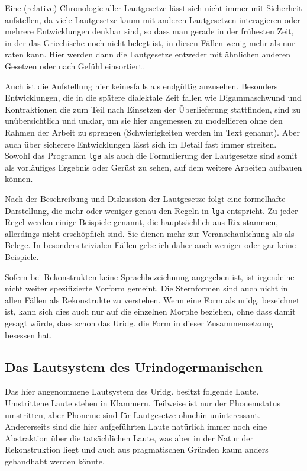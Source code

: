 \documentclass[12pt,a4paper,normalheadings]{scrartcl}
\def\tt#1{\texttt{#1}}
\begin{document}
Eine (relative) Chronologie aller Lautgesetze lässt sich nicht immer
mit Sicherheit aufstellen,
da viele Lautgesetze kaum mit anderen Lautgesetzen interagieren
oder mehrere Entwicklungen denkbar sind,
so dass man gerade in der frühesten Zeit,
in der das Griechische noch nicht belegt ist,
in diesen Fällen wenig mehr als nur raten kann.
Hier werden dann die Lautgesetze entweder mit ähnlichen
anderen Gesetzen oder nach Gefühl einsortiert.

Auch ist die Aufstellung hier keinesfalls als endgültig anzusehen.
Besonders Entwicklungen, die in die spätere dialektale Zeit fallen
wie Digammaschwund und Kontraktionen
die zum Teil nach Einsetzen der Überlieferung stattfinden,
sind zu unübersichtlich und unklar,
um sie hier angemessen zu modellieren ohne den Rahmen der Arbeit zu sprengen
(Schwierigkeiten werden im Text genannt).
Aber auch über sicherere Entwicklungen lässt sich im Detail fast immer streiten.
Sowohl das Programm \tt{lga} als auch die Formulierung
der Lautgesetze sind somit als vorläufiges Ergebnis oder Gerüst zu sehen,
auf dem weitere Arbeiten aufbauen können.

Nach der Beschreibung und Diskussion der Lautgesetze folgt eine
formelhafte Darstellung,
 die mehr oder weniger genau den Regeln in \tt{lga} entspricht.
Zu jeder Regel werden einige Beispiele genannt,
die hauptsächlich aus Rix stammen,
allerdings nicht erschöpflich sind.
Sie dienen mehr zur Veranschaulichung als als Belege.
In besonders trivialen Fällen gebe ich daher auch weniger oder
gar keine Beispiele.

Sofern bei Rekonstrukten keine Sprachbezeichnung angegeben ist,
ist irgendeine nicht weiter spezifizierte Vorform gemeint.
Die Sternformen sind auch nicht in allen Fällen als
Rekonstrukte zu verstehen.
Wenn eine Form als uridg. bezeichnet ist,
kann sich dies auch nur auf die einzelnen Morphe beziehen,
ohne dass damit gesagt würde,
dass schon das Uridg. die Form in dieser Zusammensetzung besessen hat.

\subsection{Das Lautsystem des Urindogermanischen}

Das hier angenommene Lautsystem des Uridg. besitzt folgende Laute.
Umstrittene Laute stehen in Klammern.
Teilweise ist nur der Phonemstatus umstritten,
aber Phoneme sind für Lautgesetze ohnehin uninteressant.
Andererseits sind die hier aufgeführten Laute natürlich immer noch
eine Abstraktion über die tatsächlichen Laute,
was aber in der Natur der Rekonstruktion liegt
und auch aus pragmatischen Gründen kaum anders gehandhabt werden könnte.
\end{document}

